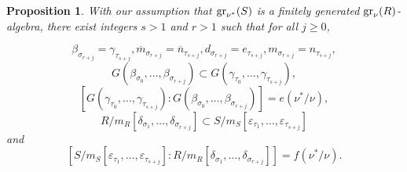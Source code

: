 \documentclass[11pt]{amsart}
\newtheorem{Proposition}[Theorem]{Proposition}
\let\epsilon\varepsilon
\begin{document}
\begin{Proposition}\label{Prop3} With our assumption that ${\rm gr}_{\nu^*}(S)$ is a finitely generated ${\rm gr}_{\nu}(R)$-algebra,  there exist integers $s>1$ and $r>1$ such that for all $j\ge 0$,

$$
\beta_{\sigma_{r+j}}=\gamma_{\tau_{s+j}},
\overline m_{\sigma_{r+j}}=\overline n_{\tau_{s+j}},
d_{\sigma_{r+j}}=e_{\tau_{s+j}},
m_{\sigma_{r+j}}=n_{\tau_{s+j}},
$$
$$
G(\beta_{\sigma_0},\ldots,\beta_{\sigma_{r+j}})\subset G(\gamma_{\tau_0},\ldots,\gamma_{\tau_{s+j}}),
$$ 
$$
 [G(\gamma_{\tau_0},\ldots,\gamma_{\tau_{s+j}}):G(\beta_{\sigma_0},\ldots,\beta_{\sigma_{r+j}})]=e(\nu^*/\nu),
$$
$$
R/m_R[\delta_{\sigma_1},\ldots,\delta_{\sigma_{r+j}}]\subset S/m_S[\epsilon_{\tau_1},\ldots,\epsilon_{\tau_{s+j}}]
$$
and
$$
[S/m_S[\epsilon_{\tau_1},\ldots,\epsilon_{\tau_{s+j}}]:R/m_R[\delta_{\sigma_1},\ldots,\delta_{\sigma_{r+j}}]]=f(\nu^*/\nu).
$$


\end{Proposition}
\end{document}
